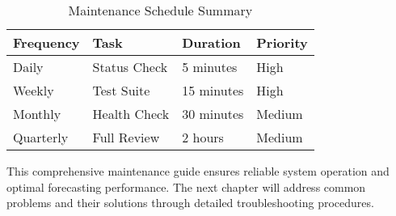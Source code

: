 \begin{table}[H]
	\centering
	\begin{tabularx}{\textwidth}{|X|X|X|X|}
		\hline
		\textbf{Frequency} & \textbf{Task} & \textbf{Duration} & \textbf{Priority} \\
		\hline
		Daily & Status Check & 5 minutes & High \\
		Weekly & Test Suite & 15 minutes & High \\
		Monthly & Health Check & 30 minutes & Medium \\
		Quarterly & Full Review & 2 hours & Medium \\
		\hline
	\end{tabularx}
	\caption{Maintenance Schedule Summary}
	\label{tab:maintenance_schedule}
\end{table}

This comprehensive maintenance guide ensures reliable system operation and optimal forecasting performance. The next chapter will address common problems and their solutions through detailed troubleshooting procedures.
